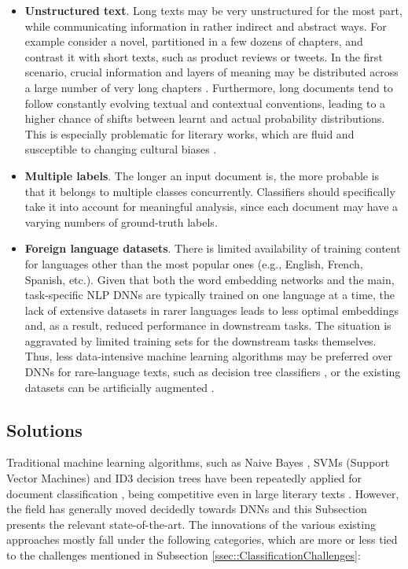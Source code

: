 \documentclass[preprint,review,10pt]{elsarticle}
\begin{document}
\begin{itemize}
		\item \textbf{Unstructured text}. Long texts may be very unstructured for the most part, while communicating information in rather indirect and abstract ways. For example consider a novel, partitioned in a few dozens of chapters, and contrast it with short texts, such as product reviews or tweets. In the first scenario, crucial information and layers of meaning may be distributed across a large number of very long chapters \cite{worsham}. Furthermore, long documents tend to follow constantly evolving textual and contextual conventions, leading to a higher chance of shifts between learnt and actual probability distributions. This is especially problematic for literary works, which are fluid and susceptible to changing cultural biases \cite{brazil}.
		
		\item \textbf{Multiple labels}. The longer an input document is, the more probable is that it belongs to multiple classes concurrently. Classifiers should specifically take it into account for meaningful analysis, since each document may have a varying numbers of ground-truth labels.
		
		\item \textbf{Foreign language datasets}. There is limited availability of training content for languages other than the most popular ones (e.g., English, French, Spanish, etc.). Given that both the word embedding networks and the main, task-specific NLP DNNs are typically trained on one language at a time, the lack of extensive datasets in rarer languages leads to less optimal embeddings and, as a result, reduced performance in downstream tasks. The situation is aggravated by limited training sets for the downstream tasks themselves. Thus, less data-intensive machine learning algorithms may be preferred over DNNs for rare-language texts, such as decision tree classifiers \cite{brazil}, or the existing datasets can be artificially augmented \cite{geroge}.
	\end{itemize}
	
	
	\subsection{Solutions}
	\label{ssec::ClassificationSolutions}
	
	Traditional machine learning algorithms, such as Naive Bayes \cite{russel}, SVMs (Support Vector Machines) \cite{cortes} and ID3 decision trees \cite{quinlan} have been repeatedly applied for document classification \cite{brazil} \cite{xu}, being competitive even in large literary texts \cite{sicong}. However, the field has generally moved decidedly towards DNNs and this Subsection presents the relevant state-of-the-art. The innovations of the various existing approaches mostly fall under the following categories, which are more or less tied to the challenges mentioned in Subsection \ref{ssec::ClassificationChallenges}:
	
\end{document}
